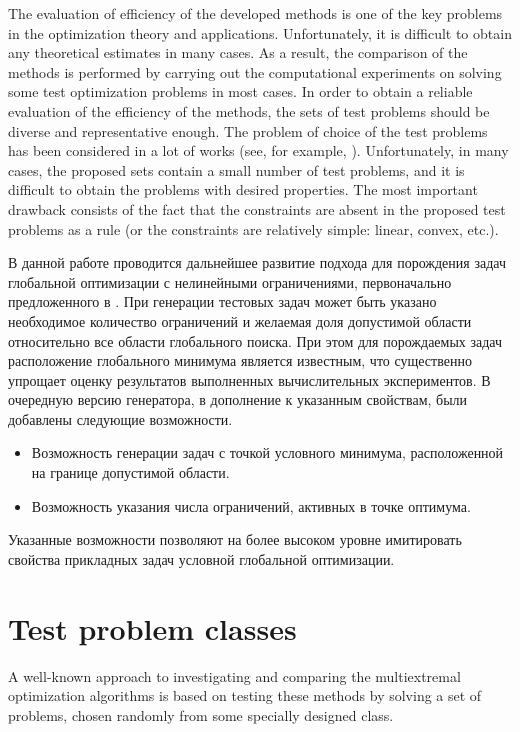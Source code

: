 \documentclass{aip-cp}
\begin{document}
The evaluation of efficiency of the developed methods is one of the key problems in the optimization theory and applications. Unfortunately, it is difficult to obtain any theoretical estimates in many cases. As a result, the comparison of the methods is performed by carrying out the computational experiments on solving some test optimization problems in most cases. In order to obtain a reliable evaluation of the efficiency of the methods, the sets of test problems should be diverse and representative enough. The problem of choice of the test problems has been considered in a lot of works (see, for example, \cite{Floudas1999,Gaviano2003,Ali2005,Addis2007}). Unfortunately, in many cases, the proposed sets contain a small number of test problems, and it is difficult to obtain the problems with desired properties. The most important drawback consists of the fact that the constraints are absent in the proposed test problems as a rule (or the constraints are relatively simple: linear, convex, etc.).

В данной работе проводится дальнейшее развитие подхода для порождения задач глобальной оптимизации с нелинейными ограничениями, первоначально предложенного в \cite{Gergel2017}. При генерации тестовых задач может быть указано необходимое количество ограничений и желаемая доля допустимой области относительно все области глобального поиска. При этом для порождаемых задач расположение глобального минимума является известным, что существенно упрощает оценку результатов выполненных вычислительных экспериментов. В очередную версию генератора, в дополнение к указанным свойствам, были добавлены следующие возможности.
\begin{itemize}
	\item Возможность генерации задач с точкой условного минимума, расположенной на границе допустимой области.
	\item Возможность указания числа ограничений, активных в точке оптимума.
\end{itemize}
Указанные возможности позволяют на более высоком уровне имитировать свойства прикладных задач условной глобальной оптимизации.


\section{Test problem classes}
A well-known approach to investigating and comparing the multiextremal optimization algorithms is based on testing these methods by solving a set of problems, chosen randomly from some specially designed class. 
\end{document}
